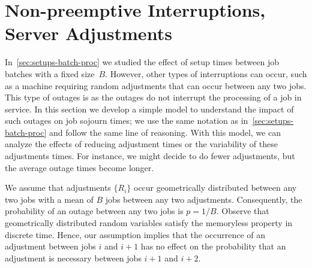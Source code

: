 \section{Non-preemptive Interruptions, Server Adjustments}
\label{sec:non-preempt-interr}


In~\cref{sec:setups-batch-proc} we studied the effect of setup times between job batches with a fixed size~$B$.
However, other types of interruptions can occur, such as a machine requiring random adjustments that can occur between any two jobs.
This type of outages is  as the outages do not interrupt the processing of a job in service.
In this section we develop a simple model to understand the impact of such outages on job sojourn times; we use the same notation as in~\cref{sec:setups-batch-proc} and follow the same line of reasoning.
With this model, we can analyze the effects of reducing adjustment times or the variability of these adjustments times.
For instance, we might decide to do fewer adjustments, but the average outage times become longer.


We assume that adjustments $\{R_i\}$ occur geometrically distributed between any two jobs with a mean of $B$ jobs between any two adjustments.
Consequently, the probability of an outage between any two jobs is $p=1/B$.
Observe that geometrically distributed random variables satisfy the memoryless property in discrete time.
Hence, our assumption implies that the occurrence of an adjustment between jobs $i$ and $i+1$ has no effect on the probability that an adjustment is necessary between jobs $i+1$ and $i+2$.


